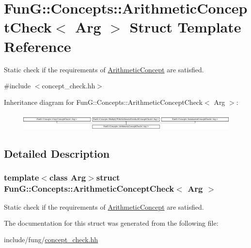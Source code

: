 \hypertarget{structFunG_1_1Concepts_1_1ArithmeticConceptCheck}{\section{Fun\-G\-:\-:Concepts\-:\-:Arithmetic\-Concept\-Check$<$ Arg $>$ Struct Template Reference}
\label{structFunG_1_1Concepts_1_1ArithmeticConceptCheck}
}


Static check if the requirements of \hyperlink{structFunG_1_1Concepts_1_1ArithmeticConcept}{Arithmetic\-Concept} are satisfied.  




{\ttfamily \#include $<$concept\-\_\-check.\-hh$>$}

Inheritance diagram for Fun\-G\-:\-:Concepts\-:\-:Arithmetic\-Concept\-Check$<$ Arg $>$\-:\begin{figure}[H]
\begin{center}
\leavevmode
\includegraphics[height=0.893142cm]{structFunG_1_1Concepts_1_1ArithmeticConceptCheck}
\end{center}
\end{figure}


\subsection{Detailed Description}
\subsubsection*{template$<$class Arg$>$struct Fun\-G\-::\-Concepts\-::\-Arithmetic\-Concept\-Check$<$ Arg $>$}

Static check if the requirements of \hyperlink{structFunG_1_1Concepts_1_1ArithmeticConcept}{Arithmetic\-Concept} are satisfied. 

The documentation for this struct was generated from the following file\-:\begin{DoxyCompactItemize}
\item 
include/fung/\hyperlink{concept__check_8hh}{concept\-\_\-check.\-hh}\end{DoxyCompactItemize}
